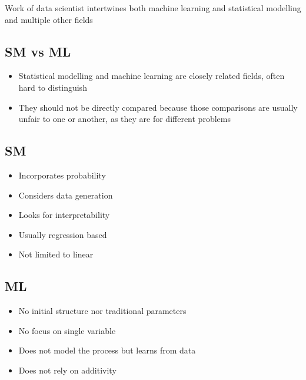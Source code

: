 \documentclass[letterpaper,10pt,english]{jupyterBook}
\begin{document}
\sphinxAtStartPar
Work of data scientist intertwines both machine learning and statistical modelling and multiple other fields


\subsection{SM vs ML}
\label{\detokenize{Lecture 1:sm-vs-ml}}\begin{itemize}
\item {} 
\sphinxAtStartPar
Statistical modelling and machine learning are closely related fields, often hard to distinguish

\item {} 
\sphinxAtStartPar
They should not be directly compared because those comparisons are usually unfair to one or another, as they are for different problems

\end{itemize}


\subsection{SM}
\label{\detokenize{Lecture 1:sm}}\begin{itemize}
\item {} 
\sphinxAtStartPar
Incorporates probability

\item {} 
\sphinxAtStartPar
Considers data generation

\item {} 
\sphinxAtStartPar
Looks for interpretability

\item {} 
\sphinxAtStartPar
Usually regression based

\item {} 
\sphinxAtStartPar
Not limited to linear

\end{itemize}


\subsection{ML}
\label{\detokenize{Lecture 1:ml}}\begin{itemize}
\item {} 
\sphinxAtStartPar
No initial structure nor traditional parameters

\item {} 
\sphinxAtStartPar
No focus on single variable

\item {} 
\sphinxAtStartPar
Does not model the process but learns from data

\item {} 
\sphinxAtStartPar
Does not rely on additivity

\end{itemize}
\end{document}
